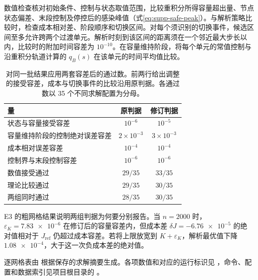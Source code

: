 \documentclass[lang=cn,a4paper,newtx]{elegantpaper}
\begin{document}
数值检查核对初始条件、控制与状态取值范围，比较重积分所得容量超出量、节点状态偏差、末段控制及停控后的感染峰值（式\eqref{eq:supp-safe-peak}）。与解析策略比较时，检查成本相对差、阶段顺序和切换区间。对每个须识别的切换事件，候选区间至多允许跨两个过渡单元。解析时刻到该区间的距离须在一个邻近最大步长以内，比较时的附加时间容差为 $10^{-10}$。在容量维持阶段，将每个单元的常值控制与沿重积分轨道计算的 $q_B(s)$ 在该单元的时间平均值比较。

\begin{table}[H]
\centering\small
\caption{对同一批结果应用两套容差后的通过数。前两行给出调整的接受容差，成本与切换事件的比较沿用原判据。各通过数以 35 个不同求解配置为分母。}
\label{tab:supp-tolerances}
\begin{tabular}{@{}lcc@{}}
\toprule
量 & 原判据 & 修订判据\\
\midrule
状态与容量接受容差 & $10^{-6}$ & $10^{-5}$\\
容量维持阶段的控制绝对误差容差 & $2\times10^{-3}$ & $3\times10^{-3}$\\
成本相对误差容差 & $10^{-4}$ & $10^{-4}$\\
控制界与末段控制容差 & $10^{-6}$ & $10^{-6}$\\
\midrule
数值接受通过 & $29/35$ & $33/35$\\
理论比较通过 & $29/35$ & $30/35$\\
两组同时通过 & $28/35$ & $30/35$\\
\bottomrule
\end{tabular}
\end{table}

E3 的粗网格结果说明两组判据为何要分别报告。当 $n=2000$ 时，$\varepsilon_K=\num{7.83e-6}$ 在修订后的容量容差内，但成本差 $\delta J=\num{-6.76e-5}$ 的绝对值相对于 $J_{\mathrm{ref}}$ 仍超过成本容差。若将上限放宽到 $K+\varepsilon_K$，解析最优值下降 $\num{1.08e-4}$，大于这一次负成本差的绝对值。

逐网格表由  根据保存的求解摘要生成。各项数值和对应的运行标识见 ，命令、配置和数据索引见项目根目录的 。
\end{document}
